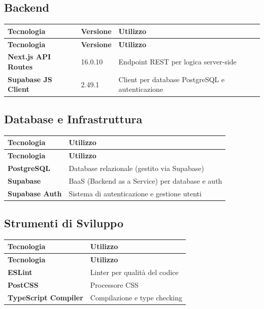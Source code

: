 \documentclass{article}
\begin{document}
\subsection{Backend}

\begin{longtable}{p{4cm}p{3cm}p{8cm}}
\toprule
\textbf{Tecnologia} & \textbf{Versione} & \textbf{Utilizzo} \\
\midrule
\endfirsthead
\toprule
\textbf{Tecnologia} & \textbf{Versione} & \textbf{Utilizzo} \\
\midrule
\endhead
\bottomrule
\endfoot
\bottomrule
\endlastfoot
\textbf{Next.js API Routes} & 16.0.10 & Endpoint REST per logica server-side \\
\textbf{Supabase JS Client} & 2.49.1 & Client per database PostgreSQL e autenticazione \\
\end{longtable}

\subsection{Database e Infrastruttura}

\begin{longtable}{p{4cm}p{11cm}}
\toprule
\textbf{Tecnologia} & \textbf{Utilizzo} \\
\midrule
\endfirsthead
\toprule
\textbf{Tecnologia} & \textbf{Utilizzo} \\
\midrule
\endhead
\bottomrule
\endfoot
\bottomrule
\endlastfoot
\textbf{PostgreSQL} & Database relazionale (gestito via Supabase) \\
\textbf{Supabase} & BaaS (Backend as a Service) per database e auth \\
\textbf{Supabase Auth} & Sistema di autenticazione e gestione utenti \\
\end{longtable}

\subsection{Strumenti di Sviluppo}

\begin{longtable}{p{4cm}p{11cm}}
\toprule
\textbf{Tecnologia} & \textbf{Utilizzo} \\
\midrule
\endfirsthead
\toprule
\textbf{Tecnologia} & \textbf{Utilizzo} \\
\midrule
\endhead
\bottomrule
\endfoot
\bottomrule
\endlastfoot
\textbf{ESLint} & Linter per qualità del codice \\
\textbf{PostCSS} & Processore CSS \\
\textbf{TypeScript Compiler} & Compilazione e type checking \\
\end{longtable}
\end{document}
